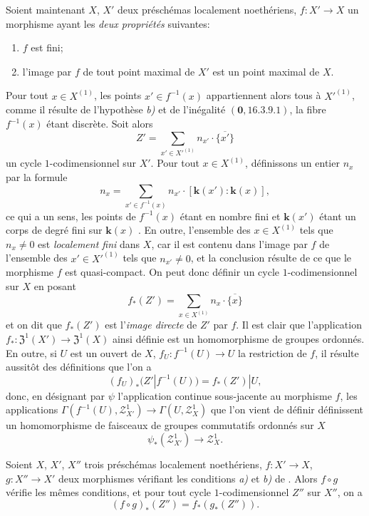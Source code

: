 \begin{env}[21.10.14]
Soient maintenant $X$, $X'$ deux préschémas localement noethériens, $f:X'\to X$ un morphisme ayant les \emph{deux propriétés} suivantes:
\begin{enumerate}[label=\emph{\alph*)}]
  \item $f$ est fini;
  \item l'image par $f$ de tout point maximal de $X'$ est un point maximal de $X$.
\end{enumerate}
Pour tout $x\in X^{(1)}$, les points $x'\in f^{-1}(x)$ appartiennent alors tous à $X'^{(1)}$, comme il résulte de l'hypothèse \emph{b)} et de l'inégalité $(\mathbf{0},16.3.9.1)$, la fibre $f^{-1}(x)$ étant discrète.
Soit alors
\[
  Z'=\sum_{x'\in X'^{(1)}}n_{x'}\cdot\overline{\{x'\}}
\]
un cycle $1$-codimensionnel sur $X'$.
Pour tout $x\in X^{(1)}$, définissons un entier $n_x$ par la formule
\[
  n_x=\sum_{x'\in f^{-1}(x)}n_{x'}\cdot[\boldsymbol{k}(x'): \boldsymbol{k}(x)],
\]
ce qui a un sens, les points de $f^{-1}(x)$ étant en nombre fini et $\boldsymbol{k}(x')$ étant un corps de degré fini sur $\boldsymbol{k}(x)$ .
En outre, l'ensemble des $x\in X^{(1)}$ tels que $n_x\neq0$ est \emph{localement fini} dans $X$, car il est contenu dans l'image par $f$ de l'ensemble des $x'\in X'^{(1)}$ tels que $n_{x'}\neq0$, et la conclusion résulte de ce que le morphisme $f$ est quasi-compact.
On peut donc définir un cycle $1$-codimensionnel sur $X$ en posant
\[
\label{IV.21.10.14.1}
  f_*(Z')=\sum_{x\in X^{(1)}}n_x\cdot\overline{\{x\}}
  \tag{21.10.14.1}
\]
et on dit que $f_*(Z')$ est l'\emph{image directe} de $Z'$ par $f$.
Il est clair que l'application $f_*:\mathfrak{Z}^1(X')\to\mathfrak{Z}^1(X)$ ainsi définie est un homomorphisme de groupes ordonnés.
En outre, si $U$ est un ouvert de $X$, $f_U:f^{-1}(U)\to U$ la restriction de $f$, il résulte aussitôt des définitions que l'on a
\[
\label{IV.21.10.14.2}
  (f_U)_*(Z'|f^{-1}(U))=f_*(Z')|U,
  \tag{21.10.14.2}
\]
donc, en désignant par $\psi$ l'application continue sous-jacente au morphisme $f$, les applications $\Gamma(f^{-1}(U),\mathscr{Z}^1_{X'})\to\Gamma(U,\mathscr{Z}^1_X)$ que l'on vient de définir définissent un homomorphisme de faisceaux de groupes commutatifs ordonnés sur $X$
\[
  \psi_*(\mathscr{Z}^1_{X'})\to\mathscr{Z}^1_X.
\]
\end{env}

\begin{proposition}[21.10.15]
\label{IV.21.10.15}
Soient $X$, $X'$, $X''$ trois préschémas localement noethériens, $f:X'\to X$, $g:X''\to X'$ deux morphismes vérifiant les conditions \emph{a)} et \emph{b)} de .
Alors $f\circ g$ vérifie les mêmes conditions, et pour tout cycle $1$-codimensionnel $Z''$ sur $X''$, on a
\[
  (f\circ g)_*(Z'')=f_*(g_*(Z'')).
\]
\end{proposition}

